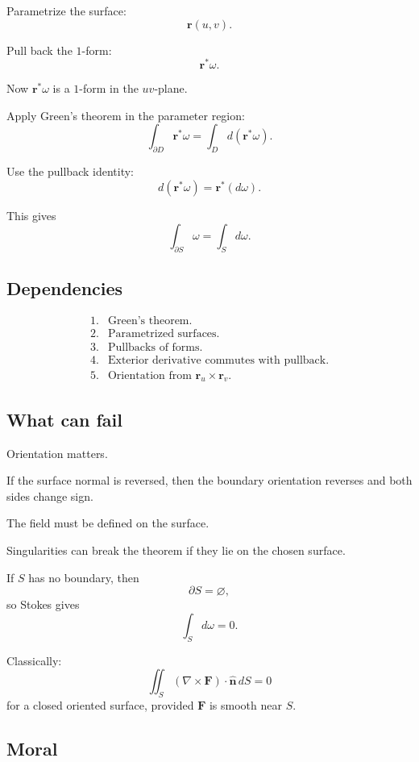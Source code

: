 Parametrize the surface:
\[
    \mathbf r(u,v).
\]

Pull back the \(1\)-form:
\[
    \mathbf r^*\omega.
\]

Now \(\mathbf r^*\omega\) is a \(1\)-form in the \(uv\)-plane.

Apply Green's theorem in the parameter region:
\[
    \int_{\partial D}\mathbf r^*\omega
    =
    \int_D d(\mathbf r^*\omega).
\]

Use the pullback identity:
\[
\boxed{
    d(\mathbf r^*\omega)=\mathbf r^*(d\omega).
}
\]

This gives
\[
    \int_{\partial S}\omega
    =
    \int_S d\omega.
\]

\subsection*{Dependencies}

\[
\begin{array}{ll}
1. & \text{Green's theorem.}\\[1mm]
2. & \text{Parametrized surfaces.}\\[1mm]
3. & \text{Pullbacks of forms.}\\[1mm]
4. & \text{Exterior derivative commutes with pullback.}\\[1mm]
5. & \text{Orientation from }\mathbf r_u\times\mathbf r_v.
\end{array}
\]

\subsection*{What can fail}

Orientation matters.

If the surface normal is reversed, then the boundary orientation reverses and both
sides change sign.

The field must be defined on the surface.

Singularities can break the theorem if they lie on the chosen surface.

If \(S\) has no boundary, then
\[
    \partial S=\varnothing,
\]
so Stokes gives
\[
\boxed{
    \int_S d\omega=0.
}
\]

Classically:
\[
\boxed{
    \iint_S(\nabla\times\mathbf F)\cdot\widehat{\mathbf n}\,dS=0
}
\]
for a closed oriented surface, provided \(\mathbf F\) is smooth near \(S\).

\subsection*{Moral}

